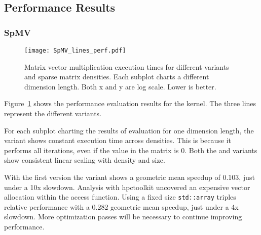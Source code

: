 \subsection{Performance Results}

\subsubsection{SpMV}
\begin{figure}
\texttt{[image: SpMV\_lines\_perf.pdf]}
\caption{Matrix vector multiplication execution times for different variants and sparse matrix densities. Each subplot charts a different dimension length. Both x and y are log scale. Lower is better.}\label{SpMVPerformance}
\end{figure}
Figure~\ref{SpMVPerformance} shows the performance evaluation results for the \SpMV{} kernel. 
The three lines represent the different variants.

For each subplot charting the results of evaluation for one dimension length, the \dense{} variant shows constant execution time across densities.
This is because it performs all iterations, even if the value in the matrix is 0.
Both the \sparseraja{} and \specialized{} variants show consistent linear scaling with density and size. 


With the first version the \sparseraja{} variant shows a geometric mean speedup of 0.103, just under a 10x slowdown.
Analysis with hpctoolkit uncovered an expensive vector allocation within the access function.
Using a fixed size \verb.std::array. triples relative performance with a 0.282 geometric mean speedup, just under a 4x slowdown.
More optimization passes will be necessary to continue improving performance.

